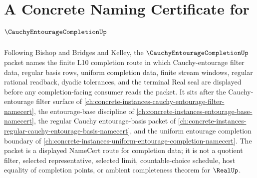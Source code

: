 \chapter{A Concrete Naming Certificate for $\CauchyEntourageCompletionUp$}
\label{ch:concrete-instances-cauchy-entourage-completion-namecert}

Following Bishop and Bridges and Kelley, the $\CauchyEntourageCompletionUp$
packet names the finite L10 completion route in which Cauchy-entourage filter
data, regular basis rows, uniform completion data, finite stream windows,
regular rational readback, dyadic tolerances, and the terminal Real seal are
displayed before any completion-facing consumer reads the packet. It sits after
the Cauchy-entourage filter surface of
\autoref{ch:concrete-instances-cauchy-entourage-filter-namecert}, the
entourage-base discipline of \autoref{ch:concrete-instances-entourage-base-namecert},
the regular Cauchy entourage-basis packet of
\autoref{ch:concrete-instances-regular-cauchy-entourage-basis-namecert}, and the
uniform entourage completion boundary of
\autoref{ch:concrete-instances-uniform-entourage-completion-namecert}. The
packet is a displayed NameCert route for completion data; it is not a quotient
filter, selected representative, selected limit, countable-choice schedule,
host equality of completion points, or ambient completeness theorem for
$\RealUp$.

